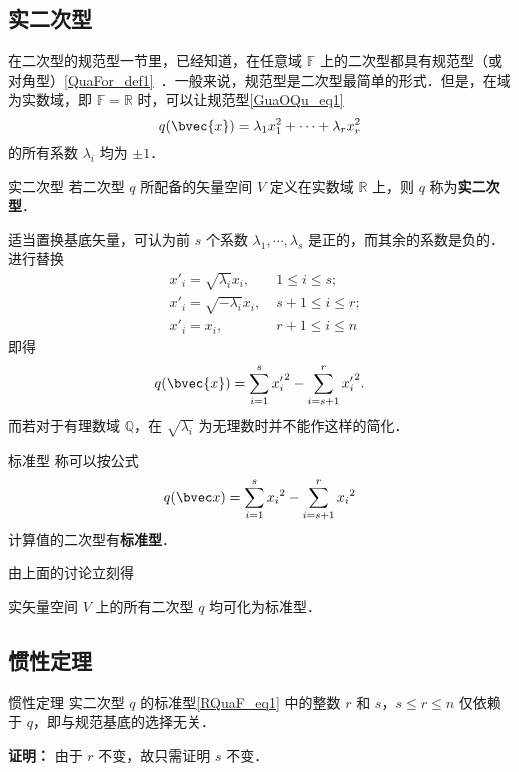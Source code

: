 
\begin{issues}
\issueDraft
\end{issues}

\subsection{实二次型}
在二次型的规范型一节里，已经知道，在任意域 $\mathbb F$ 上的二次型都具有规范型（或对角型）\autoref{QuaFor_def1}~．一般来说，规范型是二次型最简单的形式．但是，在域为实数域，即 $\mathbb F=\mathbb R$ 时，可以让规范型\autoref{GuaOQu_eq1}~
\begin{equation}
q(\bvec{x})=\lambda_1 x_1^2+\cdots+\lambda_r x_r^2
\end{equation}
的所有系数 $\lambda_i$ 均为 $\pm 1$．
\begin{definition}{实二次型}
若二次型 $q$ 所配备的矢量空间 $V$ 定义在实数域 $\mathbb R$ 上，则 $q$ 称为\textbf{实二次型}．
\end{definition}
适当置换基底矢量，可认为前 $s$ 个系数 $\lambda_1,\cdots,\lambda_s$ 是正的，而其余的系数是负的．进行替换
\begin{equation}
\begin{aligned}
&x'_i=\sqrt{\lambda_i}x_i,\;&1\leq i\leq s;\\
&x'_i=\sqrt{-\lambda_i}x_i,\;&s+1\leq i\leq r;\\
&x'_i=x_i,\; &r+1\leq i\leq n
\end{aligned}
\end{equation}
 即得
 \begin{equation}
 q(\bvec{x})=\sum_{i=1}^{s}{x'_i}^2-\sum_{i=s+1}^{r} {x'_{i}}^{2}.
 \end{equation}
 而若对于有理数域 $\mathbb Q$，在 $\sqrt{\lambda_i}$ 为无理数时并不能作这样的简化．
 
\begin{definition}{标准型}
称可以按公式
\begin{equation}\label{RQuaF_eq1}
q(\bvec x)=\sum_{i=1}^{s}{x_i}^2-\sum_{i=s+1}^{r} {x_{i}}^{2}
\end{equation}
计算值的二次型有\textbf{标准型}．
\end{definition}
由上面的讨论立刻得
\begin{theorem}{}
实矢量空间 $V$ 上的所有二次型 $q$ 均可化为标准型．
\end{theorem}
\subsection{惯性定理}
\begin{theorem}{惯性定理}
实二次型 $q$ 的标准型\autoref{RQuaF_eq1} 中的整数 $r$ 和 $s$，$s\leq r\leq n$ 仅依赖于 $q$，即与规范基底的选择无关．
\end{theorem}
\textbf{证明：} 由于 $r$ 不变，故只需证明 $s$ 不变．

